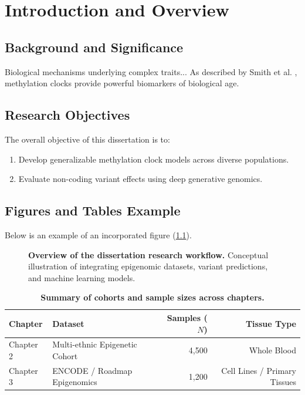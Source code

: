 \chapter{Introduction and Overview}
\label{ch:intro}

\section{Background and Significance}
Biological mechanisms underlying complex traits... As described by Smith et al. \cite{Smith2024}, methylation clocks provide powerful biomarkers of biological age.

\section{Research Objectives}
The overall objective of this dissertation is to:
\begin{enumerate}
    \item Develop generalizable methylation clock models across diverse populations.
    \item Evaluate non-coding variant effects using deep generative genomics.
\end{enumerate}

\section{Figures and Tables Example}
Below is an example of an incorporated figure (\cref{fig:pipeline_overview}).

\begin{figure}[htbp]
    \centering
    \singlespacing
    \caption[Overview of the dissertation research workflow]{{\bfseries Overview of the dissertation research workflow.} Conceptual illustration of integrating epigenomic datasets, variant predictions, and machine learning models.}
    \label{fig:pipeline_overview}
\end{figure}

\begin{table}[htbp]
    \centering
    \singlespacing
    \caption[Summary of cohorts and sample sizes]{{\bfseries Summary of cohorts and sample sizes across chapters.}}
    \label{tab:sample_summary}
    \begin{tabular}{llrr}
        \toprule
        \textbf{Chapter} & \textbf{Dataset} & \textbf{Samples ($N$)} & \textbf{Tissue Type} \\
        \midrule
        Chapter 2 & Multi-ethnic Epigenetic Cohort & 4,500 & Whole Blood \\
        Chapter 3 & ENCODE / Roadmap Epigenomics & 1,200 & Cell Lines / Primary Tissues \\
        \bottomrule
    \end{tabular}
\end{table}
